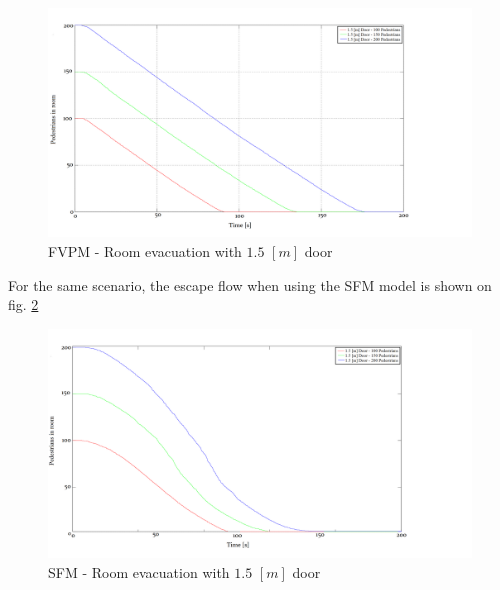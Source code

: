 \documentclass[english]{article}
\begin{document}
    
    \begin{figure}[H]
        \begin{centering}
        \includegraphics[scale=0.2]{pics/flow/15door} 
        \par\end{centering}
        \caption{\label{fig:room-flow-150}FVPM - Room evacuation with $1.5$ $[m]$ door}
    \end{figure}
    
    For the same scenario, the escape flow when using the SFM model is shown on fig. \ref{fig:sfm-room-flow-15}
    
    \begin{figure}[H]
        \begin{centering}
        \includegraphics[scale=0.2]{pics/flow/sfm/sfm15door} 
        \par\end{centering}
        \caption{\label{fig:sfm-room-flow-15}SFM - Room evacuation with $1.5$ $[m]$ door}
    \end{figure}
\end{document}
